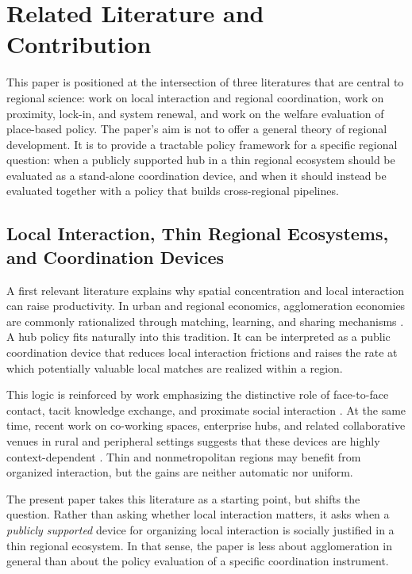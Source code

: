 \section{Related Literature and Contribution}
\label{sec:lit}

This paper is positioned at the intersection of three literatures that are central to regional science: work on local interaction and regional coordination, work on proximity, lock-in, and system renewal, and work on the welfare evaluation of place-based policy. The paper's aim is not to offer a general theory of regional development. It is to provide a tractable policy framework for a specific regional question: when a publicly supported hub in a thin regional ecosystem should be evaluated as a stand-alone coordination device, and when it should instead be evaluated together with a policy that builds cross-regional pipelines.

\subsection{Local Interaction, Thin Regional Ecosystems, and Coordination Devices}

A first relevant literature explains why spatial concentration and local interaction can raise productivity. In urban and regional economics, agglomeration economies are commonly rationalized through matching, learning, and sharing mechanisms \citep{DurantonPuga2004,RosenthalStrange2004}. A hub policy fits naturally into this tradition. It can be interpreted as a public coordination device that reduces local interaction frictions and raises the rate at which potentially valuable local matches are realized within a region.

This logic is reinforced by work emphasizing the distinctive role of face-to-face contact, tacit knowledge exchange, and proximate social interaction \citep{StorperVenables2004,JaffeTrajtenbergHenderson1993,RocheOettlCatalini2024}. At the same time, recent work on co-working spaces, enterprise hubs, and related collaborative venues in rural and peripheral settings suggests that these devices are highly context-dependent \citep{VoglAkhavan2022,MerrellRoweCowieGkartzios2021,MerrellPhillipsonGortonCowie2022,OECD2025}. Thin and nonmetropolitan regions may benefit from organized interaction, but the gains are neither automatic nor uniform.

The present paper takes this literature as a starting point, but shifts the question. Rather than asking whether local interaction matters, it asks when a \emph{publicly supported} device for organizing local interaction is socially justified in a thin regional ecosystem. In that sense, the paper is less about agglomeration in general than about the policy evaluation of a specific coordination instrument.

